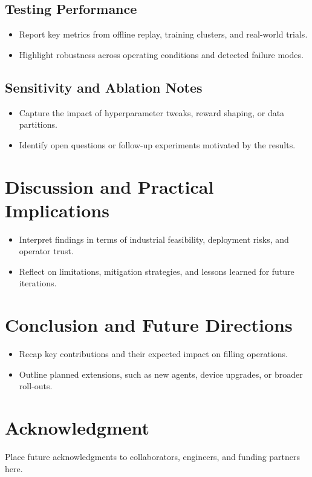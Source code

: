 \documentclass[journal]{IEEEtranTIE}
\begin{document}
\subsection{Testing Performance}
\begin{itemize}
  \item Report key metrics from offline replay, training clusters, and real-world trials.
  \item Highlight robustness across operating conditions and detected failure modes.
\end{itemize}
\subsection{Sensitivity and Ablation Notes}
\begin{itemize}
  \item Capture the impact of hyperparameter tweaks, reward shaping, or data partitions.
  \item Identify open questions or follow-up experiments motivated by the results.
\end{itemize}

\section{Discussion and Practical Implications}
\begin{itemize}
  \item Interpret findings in terms of industrial feasibility, deployment risks, and operator trust.
  \item Reflect on limitations, mitigation strategies, and lessons learned for future iterations.
\end{itemize}

\section{Conclusion and Future Directions}
\begin{itemize}
  \item Recap key contributions and their expected impact on filling operations.
  \item Outline planned extensions, such as new agents, device upgrades, or broader roll-outs.
\end{itemize}

\section*{Acknowledgment}
Place future acknowledgments to collaborators, engineers, and funding partners here.
\end{document}
